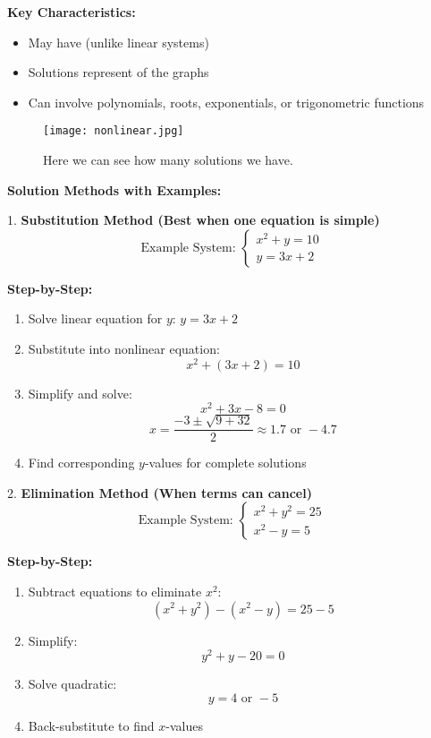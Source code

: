 \documentclass{article} %
\begin{document}
\textbf{Key Characteristics:}
\begin{itemize}
    \item May have  (unlike linear systems)
    \item Solutions represent  of the graphs
    \item Can involve polynomials, roots, exponentials, or trigonometric functions
\end{itemize}
\begin{figure}[H]
    \centering
    \texttt{[image: nonlinear.jpg]}
    \caption{Here we can see how many solutions we have.}
    \label{fig:etiqueta}
\end{figure}
\textbf{Solution Methods with Examples:}

1. \textbf{Substitution Method (Best when one equation is simple)}
\[
\text{Example System: }
\begin{cases}
x^2 + y = 10 \\
y = 3x + 2
\end{cases}
\]

\textbf{Step-by-Step:}
\begin{enumerate}
    \item Solve linear equation for $y$: $y = 3x + 2$
    \item Substitute into nonlinear equation:
    \[ x^2 + (3x + 2) = 10 \]
    \item Simplify and solve:
    \[ x^2 + 3x - 8 = 0 \]
    \[ x = \frac{-3 \pm \sqrt{9 + 32}}{2} \approx 1.7 \text{ or } -4.7 \]
    \item Find corresponding $y$-values for complete solutions
\end{enumerate}

2. \textbf{Elimination Method (When terms can cancel)}
\[
\text{Example System: }
\begin{cases}
x^2 + y^2 = 25 \\
x^2 - y = 5
\end{cases}
\]

\textbf{Step-by-Step:}
\begin{enumerate}
    \item Subtract equations to eliminate $x^2$:
    \[ (x^2 + y^2) - (x^2 - y) = 25 - 5 \]
    \item Simplify:
    \[ y^2 + y - 20 = 0 \]
    \item Solve quadratic:
    \[ y = 4 \text{ or } -5 \]
    \item Back-substitute to find $x$-values
\end{enumerate}
\end{document}
